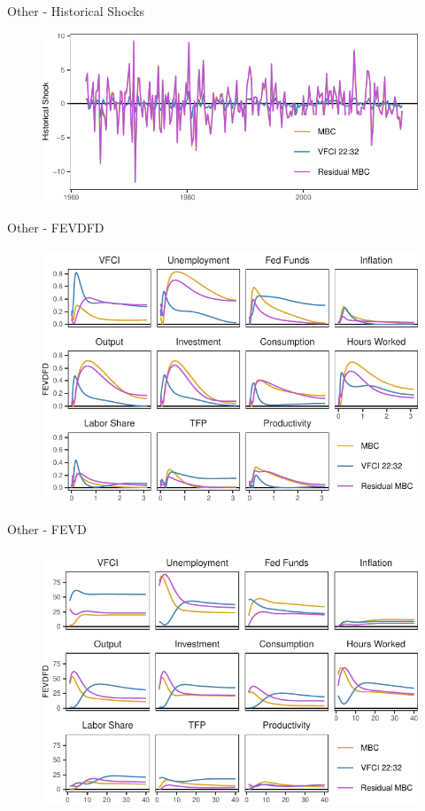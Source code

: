\begin{frame}{Other - Historical Shocks }
    
    \vspace{-0.25cm}

    \begin{figure}
        \includegraphics[height = 2in]{figs/fig8_hist_shocks.pdf}
    \end{figure}

\end{frame}


\begin{frame}{Other - FEVDFD }
    
    \vspace{-0.25cm}
    
    \begin{figure}
        \includegraphics[height = 3in]{figs/fig9_fevdfd.pdf}
    \end{figure}

\end{frame}


\begin{frame}{Other - FEVD }
    
    \vspace{-0.25cm}
     
    \begin{figure}
        \includegraphics[height = 3in]{figs/fig10_fevd.pdf}
    \end{figure}   

\end{frame}